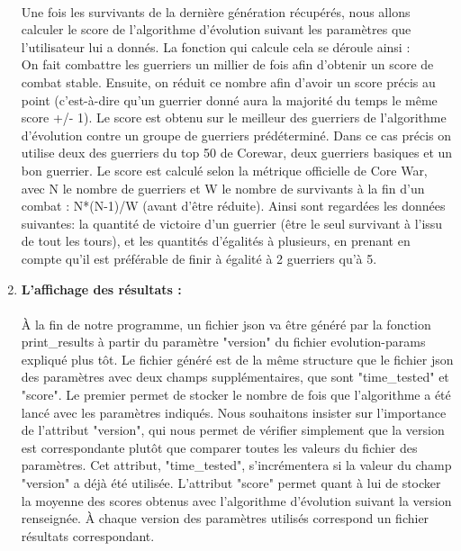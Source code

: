 \documentclass[french]{article}
\begin{document}
\begin{enumerate}
                    \paragraph{}Une fois les survivants de la dernière génération récupérés, nous allons calculer le score de l'algorithme d'évolution suivant les paramètres que l'utilisateur lui a donnés. La fonction qui calcule cela se déroule ainsi : \\
                
                    On fait combattre les guerriers un millier de fois afin d'obtenir un score de combat stable. Ensuite, on réduit ce nombre afin d'avoir un score précis au point (c'est-à-dire qu'un guerrier donné aura la majorité du temps le même score +/- 1). Le score est obtenu sur le meilleur des guerriers de l'algorithme d'évolution contre un groupe de guerriers prédéterminé. Dans ce cas précis on utilise deux des guerriers du top 50 de Corewar, deux guerriers basiques et un bon guerrier. Le score est calculé selon la métrique officielle de Core War, avec N le nombre de guerriers et W le nombre de survivants à la fin d'un combat : N*(N-1)/W (avant d'être réduite). Ainsi sont regardées les données suivantes: la quantité de victoire d'un guerrier (être le seul survivant à l'issu de tout les tours), et les quantités d'égalités à plusieurs, en prenant en compte qu'il est préférable de finir à égalité à 2 guerriers qu'à 5.\\
                    
                \item \textbf{L'affichage des résultats :}
                    \paragraph{} À la fin de notre programme, un fichier json va être généré par la fonction print\_results à partir du paramètre "version" du fichier evolution-params expliqué plus tôt. Le fichier généré est de la même structure que le fichier json des paramètres avec deux champs supplémentaires, que sont "time\_tested" et "score". Le premier permet de stocker le nombre de fois que l'algorithme a été lancé avec les paramètres indiqués. Nous souhaitons insister sur l'importance de l'attribut "version", qui nous permet de vérifier simplement que la version est correspondante plutôt que comparer toutes les valeurs du fichier des paramètres. Cet attribut, "time\_tested", s'incrémentera si la valeur du champ "version" a déjà été utilisée. L'attribut "score" permet quant à lui de stocker la moyenne des scores obtenus avec l'algorithme d'évolution suivant la version renseignée. À chaque version des paramètres utilisés correspond un fichier résultats correspondant.
                    

\end{enumerate}
\end{document}
